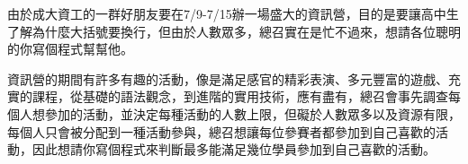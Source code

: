 由於成大資工的一群好朋友要在7/9-7/15辦一場盛大的資訊營，目的是要讓高中生了解為什麼大括號要換行，但由於人數眾多，總召實在是忙不過來，想請各位聰明的你寫個程式幫幫他。

資訊營的期間有許多有趣的活動，像是滿足感官的精彩表演、多元豐富的遊戲、充實的課程，從基礎的語法觀念，到進階的實用技術，應有盡有，總召會事先調查每個人想參加的活動，並決定每種活動的人數上限，但礙於人數眾多以及資源有限，每個人只會被分配到一種活動參與，總召想讓每位參賽者都參加到自己喜歡的活動，因此想請你寫個程式來判斷最多能滿足幾位學員參加到自己喜歡的活動。
